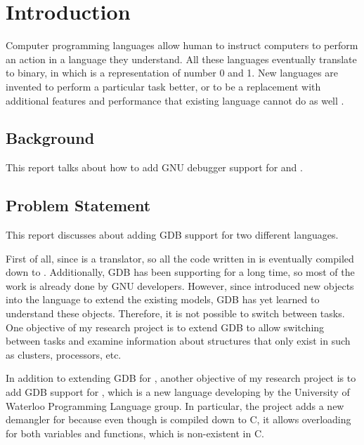 \chapter{Introduction} \label{introduction}

Computer programming languages allow human to instruct computers to perform an
action in a language they understand. All these languages eventually translate
to binary, in which is a representation of number 0 and 1. New languages are
invented to perform a particular task better, or to be a replacement with
additional features and performance that existing language cannot do as well
\cite{Reference1}.

\section{Background}
This report talks about how to add GNU debugger support for \uCPPS and \CFA.

\section{Problem Statement}

This report discusses about adding GDB support for two different languages.

First of all, since \uCPPS is a translator, so all the code written in \uCPPS is eventually
compiled down to \CC. Additionally, GDB has been supporting \CCS for a long time,
so most of the work is already done by GNU developers. However, since \uCPPS introduced
new objects into the language to extend the existing models, GDB has yet learned
to understand these objects. Therefore, it is not possible to switch between
tasks. One objective of my research project is to extend GDB to allow switching
between tasks and examine information about structures that only exist in \uCPPS
such as clusters, processors, etc.

In addition to extending GDB for \uCPPS, another objective of my research project
is to add GDB support for \CFA, which is a new language developing by the
University of Waterloo Programming Language group. In particular, the project
adds a new demangler for \CFAS because even though \CFAS is compiled
down to C, it allows overloading for both variables and functions, which is
non-existent in C.
